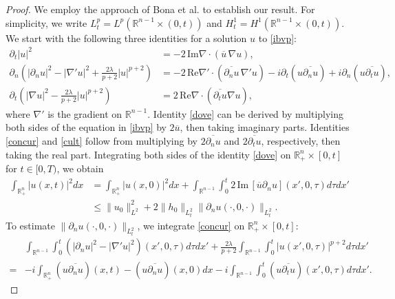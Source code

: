 \documentclass[preprint,compress,12pt]{elsarticle}
\numberwithin{equation}{section}
\begin{document}
\begin{proof}
	We employ the approach of Bona et al. \cite{figment} to establish our result. For simplicity, we write $L^{p}_{t}=L^{p}(\mathbb{R}^{n-1}\times(0,t))$ and $H^{1}_{t}=H^{1}(\mathbb{R}^{n-1}\times(0,t))$. We start with the following three identities for a solution $u$ to \eqref{ibvp}:
	\begin{align} \partial_{t} |u|^{2}&=-2\,\text{Im}\nabla\cdot (\overline{u}\, \nabla u ) ,\label{dove} \\ \partial_{n}\left(|\partial_{n}u|^{2}-|\nabla'u|^{2}+\frac{2\lambda}{p+2}|u|^{p+2}\right)&=-2\,\text{Re}\nabla'\cdot (\overline{\partial_{n}u}\, \nabla' u )-i\partial_{t}(u\overline{\partial_{n}u})+i\partial_{n}(u\overline{\partial_{t}u}),\label{concur} \\ \partial_{t}\left(|\nabla u|^{2}-\frac{2\lambda}{p+2}|u|^{p+2}\right)&=2\,\text{Re}\nabla\cdot (\overline{\partial_{t}u}\nabla u),\label{cult}
	\end{align}
	where $\nabla'$ is the gradient on $\mathbb{R}^{n-1}$. Identity \eqref{dove} can be derived by multiplying both sides of the equation in \eqref{ibvp} by $2\overline{u}$, then taking imaginary parts.  Identities \eqref{concur} and \eqref{cult} follow from multiplying by $2\overline{\partial_{n}u}$ and $2\overline{\partial_{t}u}$, respectively, then taking the real part. Integrating both sides of the identity \eqref{dove} on $\mathbb{R}^{n}_{+}\times[0,t]$ for $t\in[0,T)$, we obtain
	\begin{equation}\label{endow}
		\begin{aligned}	\int_{\mathbb{R}^{n}_{+}}|u(x,t)|^{2}dx&=\int_{\mathbb{R}^{n}_{+}}|u(x,0)|^{2}dx+\int_{\mathbb{R}^{n-1}}\int_{0}^{t}2\,\text{Im}\,[\overline{u}\partial_{n}u](x',0,\tau)d\tau dx'\\&\leq \|u_{0}\|_{L^2}^{2}+2\|h_{0}\|_{L^{2}_{t}}\|\partial_{n}u(\cdot,0,\cdot)\|_{L^{2}_{t}}.
		\end{aligned}
	\end{equation}
	To estimate $\|\partial_{n}u(\cdot,0,\cdot)\|_{L^{2}_{t}}$, we integrate \eqref{concur} on $\mathbb{R}^{n}_{+}\times[0,t]$:
	\begin{equation}\label{fsj}
		\begin{aligned} &\int_{\mathbb{R}^{n-1}}\int_{0}^{t}(|\partial_{n}u|^{2}-|\nabla'u|^{2})(x',0,\tau)d\tau dx'+\frac{2\lambda}{p+2}\int_{\mathbb{R}^{n-1}}\int_{0}^{t}\left|u(x',0,\tau)\right|^{p+2}d\tau dx'\\				=&-i\int_{\mathbb{R}^{n}_{+}}(u\overline{\partial_{n}u})(x,t)-(u\overline{\partial_{n}u})(x,0)dx-i\int_{\mathbb{R}^{n-1}}\int_{0}^{t}(u\overline{\partial_{t}u})(x',0,\tau)d\tau dx'.

\end{aligned}
\end{equation}
\end{proof}
\end{document}
